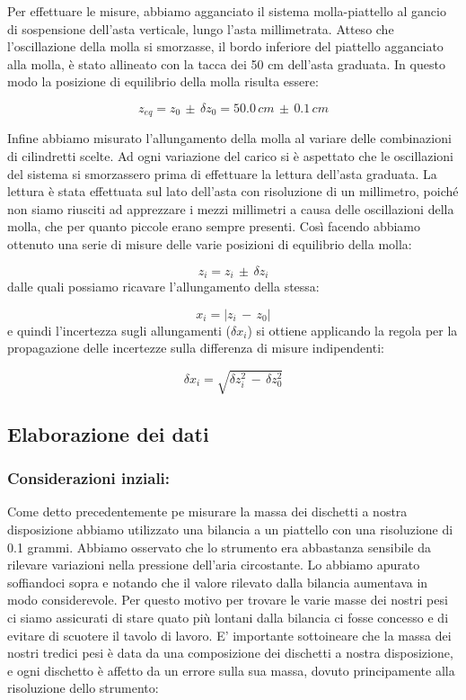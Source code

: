 Per effettuare le misure, abbiamo agganciato il sistema molla-piattello al gancio di sospensione dell'asta verticale, lungo l'asta millimetrata. Atteso che l'oscillazione della molla si smorzasse, il bordo inferiore del piattello agganciato alla molla, è stato allineato con la tacca dei 50 cm dell'asta graduata. In questo modo la posizione di equilibrio della molla risulta essere:

\begin{equation*}
	z_{eq} = z_0\,\pm\,\delta z_0 = 50.0\,cm\,\pm\,0.1\,cm
\end{equation*}

Infine abbiamo misurato l'allungamento della molla al variare delle combinazioni di cilindretti scelte. Ad ogni variazione del carico si è aspettato che le oscillazioni del sistema si smorzassero prima di effettuare la lettura dell'asta graduata. La lettura è stata effettuata sul lato dell'asta con risoluzione di un millimetro, poiché non siamo riusciti ad apprezzare i mezzi millimetri a causa delle oscillazioni della molla, che per quanto piccole erano sempre presenti. Così facendo abbiamo ottenuto una serie di misure delle varie posizioni di equilibrio della molla:

\begin{equation*}
	z_i = z_i\,\pm\,\delta z_i 
\end{equation*}
%
dalle quali possiamo ricavare l'allungamento della stessa:

\begin{equation*}
	x_i = |z_i\,-\,z_0|
\end{equation*}
%
e quindi l’incertezza sugli allungamenti ($\delta x_i$) si ottiene applicando la regola per la propagazione delle incertezze sulla differenza di misure indipendenti:

\begin{equation*}
	\delta x_i = \sqrt{\delta z_i^2\,-\,\delta z_0^2}
\end{equation*}

\subsection{Elaborazione dei dati}

\subsubsection{Considerazioni inziali:}
Come detto precedentemente pe misurare la massa dei dischetti a nostra disposizione abbiamo utilizzato una bilancia a un piattello con una risoluzione di 0.1 grammi. Abbiamo osservato che lo strumento era abbastanza sensibile da rilevare variazioni nella pressione dell'aria circostante. Lo abbiamo apurato soffiandoci sopra e notando che il valore rilevato dalla bilancia aumentava in modo considerevole. Per questo motivo per trovare le varie masse dei nostri pesi ci siamo assicurati di stare quato più lontani dalla bilancia ci fosse concesso e di evitare di scuotere il tavolo di lavoro.
E' importante sottoineare che la massa dei nostri tredici pesi è data da una composizione dei dischetti a nostra disposizione, e ogni dischetto è affetto da un errore sulla sua massa, dovuto principamente alla risoluzione dello strumento:

